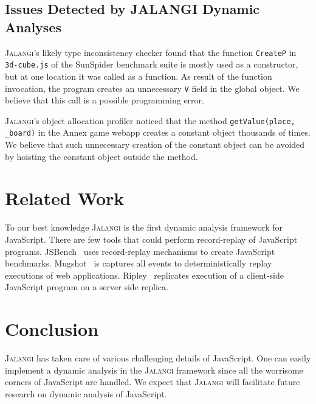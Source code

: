 \documentclass{sig-alternate}
\def\jalangi{\textsc{Jalangi}}
\begin{document}
\subsection{Issues Detected by JALANGI Dynamic Analyses}
\label{sec:issu-detect-dynam}

\jalangi{}'s likely type inconsistency checker found that the function
\texttt{CreateP} in \texttt{3d-cube.js} of the SunSpider benchmark
suite is mostly used as a constructor, but at one location it was
called as a function.  As result of the function invocation, the
program creates an unnecessary \texttt{V} field in the global object.
We believe that this call is a possible programming error.

\jalangi{}'s object allocation profiler noticed that the method
\texttt{getValue(place, \_board)} in the Annex game webapp creates a
constant object thousands of times.  We believe that such unnecessary
creation of the constant object can be avoided by hoisting the
constant object outside the method.


\vspace*{-2ex}
\section{Related Work}
\label{sec:related-work}

To our best knowledge \jalangi{} is the first dynamic analysis
framework for JavaScript.  There are few tools that could perform
record-replay of JavaScript programs.
JSBench~\cite{Richards:2011:ACJ:2048066.2048119} uses record-replay
mechanisms to create JavaScript benchmarks.
Mugshot~\cite{Mickens:2010:MDC:1855711.1855722} is captures all events
to deterministically replay executions of web applications.
Ripley~\cite{Vikram:2009:RAS:1653662.1653685} replicates execution of
a client-side JavaScript program on a server side replica.


\vspace*{-2ex}
\section{Conclusion}
\label{sec:conclusion}

\jalangi{} has taken care of various challenging details of JavaScript.  One
can easily implement a dynamic analysis in the \jalangi{} framework
since all the worrisome corners of JavaScript are handled.  We expect that
\jalangi{} will facilitate future research on dynamic analysis of
JavaScript. 
\end{document}
